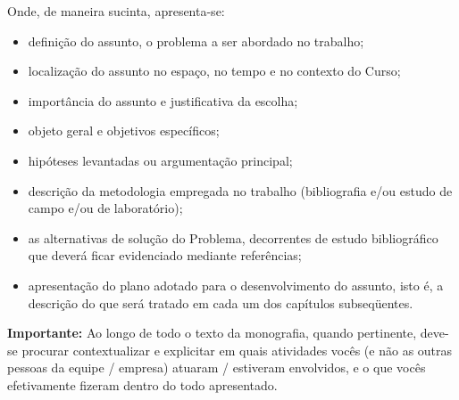 Onde, de maneira sucinta, apresenta-se:

\begin{itemize}
\item 	definição do assunto, o problema a ser abordado no trabalho;
\item 	localização do assunto no espaço, no tempo e no contexto do Curso;
\item 	importância do assunto e justificativa da escolha;
\item 	objeto geral e objetivos específicos;
\item 	hipóteses levantadas ou argumentação principal;
\item 	descrição da metodologia empregada no trabalho (bibliografia e/ou estudo de campo e/ou de laboratório);
\item 	as alternativas de solução do Problema, decorrentes de estudo bibliográfico que deverá ficar evidenciado mediante referências;
\item 	apresentação do plano adotado para o desenvolvimento do assunto, isto é, a descrição do que será tratado em cada um dos capítulos subseqüentes.
\end{itemize}

    
\textbf{Importante:} Ao longo de todo o texto da monografia, quando pertinente, deve-se procurar contextualizar e explicitar em quais atividades vocês (e não as outras pessoas da equipe / empresa) atuaram / estiveram envolvidos, e o que vocês efetivamente fizeram dentro do todo apresentado.